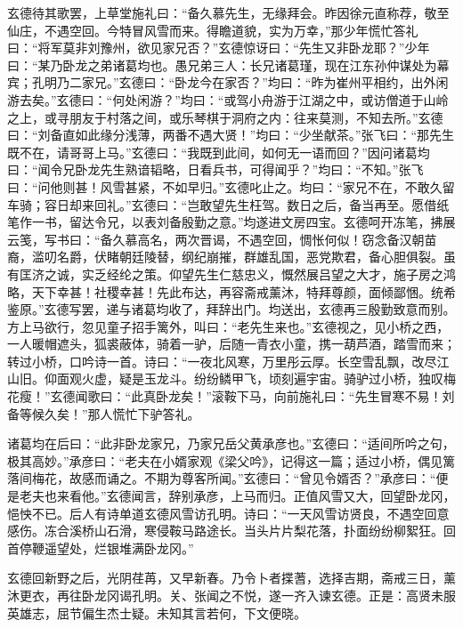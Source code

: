 玄德待其歌罢，上草堂施礼曰：“备久慕先生，无缘拜会。昨因徐元直称荐，敬至仙庄，不遇空回。今特冒风雪而来。得瞻道貌，实为万幸，”那少年慌忙答礼曰：“将军莫非刘豫州，欲见家兄否？”玄德惊讶曰：“先生又非卧龙耶？”少年曰：“某乃卧龙之弟诸葛均也。愚兄弟三人：长兄诸葛瑾，现在江东孙仲谋处为幕宾；孔明乃二家兄。”玄德曰：“卧龙今在家否？”均曰：“昨为崔州平相约，出外闲游去矣。”玄德曰：“何处闲游？”均曰：“或驾小舟游于江湖之中，或访僧道于山岭之上，或寻朋友于村落之间，或乐琴棋于洞府之内：往来莫测，不知去所。”玄德曰：“刘备直如此缘分浅薄，两番不遇大贤！”均曰：“少坐献茶。”张飞曰：“那先生既不在，请哥哥上马。”玄德曰：“我既到此间，如何无一语而回？”因问诸葛均曰：“闻令兄卧龙先生熟谙韬略，日看兵书，可得闻乎？”均曰：“不知。”张飞曰：“问他则甚！风雪甚紧，不如早归。”玄德叱止之。均曰：“家兄不在，不敢久留车骑；容日却来回礼。”玄德曰：“岂敢望先生枉驾。数日之后，备当再至。愿借纸笔作一书，留达令兄，以表刘备殷勤之意。”均遂进文房四宝。玄德呵开冻笔，拂展云笺，写书曰：“备久慕高名，两次晋谒，不遇空回，惆怅何似！窃念备汉朝苗裔，滥叨名爵，伏睹朝廷陵替，纲纪崩摧，群雄乱国，恶党欺君，备心胆俱裂。虽有匡济之诚，实乏经纶之策。仰望先生仁慈忠义，慨然展吕望之大才，施子房之鸿略，天下幸甚！社稷幸甚！先此布达，再容斋戒薰沐，特拜尊颜，面倾鄙悃。统希鉴原。”玄德写罢，递与诸葛均收了，拜辞出门。均送出，玄德再三殷勤致意而别。方上马欲行，忽见童子招手篱外，叫曰：“老先生来也。”玄德视之，见小桥之西，一人暖帽遮头，狐裘蔽体，骑着一驴，后随一青衣小童，携一葫芦酒，踏雪而来；转过小桥，口吟诗一首。诗曰：“一夜北风寒，万里彤云厚。长空雪乱飘，改尽江山旧。仰面观火虚，疑是玉龙斗。纷纷鳞甲飞，顷刻遍宇宙。骑驴过小桥，独叹梅花瘦！”玄德闻歌曰：“此真卧龙矣！”滚鞍下马，向前施礼曰：“先生冒寒不易！刘备等候久矣！”那人慌忙下驴答礼。

诸葛均在后曰：“此非卧龙家兄，乃家兄岳父黄承彦也。”玄德曰：“适间所吟之句，极其高妙。”承彦曰：“老夫在小婿家观《梁父吟》，记得这一篇；适过小桥，偶见篱落间梅花，故感而诵之。不期为尊客所闻。”玄德曰：“曾见令婿否？”承彦曰：“便是老夫也来看他。”玄德闻言，辞别承彦，上马而归。正值风雪又大，回望卧龙冈，悒怏不已。后人有诗单道玄德风雪访孔明。诗曰：“一天风雪访贤良，不遇空回意感伤。冻合溪桥山石滑，寒侵鞍马路途长。当头片片梨花落，扑面纷纷柳絮狂。回首停鞭遥望处，烂银堆满卧龙冈。”

玄德回新野之后，光阴荏苒，又早新春。乃令卜者揲蓍，选择吉期，斋戒三日，薰沐更衣，再往卧龙冈谒孔明。关、张闻之不悦，遂一齐入谏玄德。正是：高贤未服英雄志，屈节偏生杰士疑。未知其言若何，下文便晓。